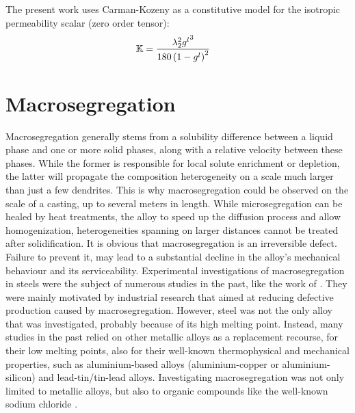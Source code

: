 The present work uses Carman-Kozeny as a constitutive model for the isotropic permeability scalar (zero order tensor):
\begin{align}
\label{eq:permeability}
& \mathbb{K}  = \frac{{\lambda}_{2}^2 {g^l}^3}{180\left( 1-{g^l} \right)^2}
\end{align}
%
%
\section{Macrosegregation}
%
Macrosegregation generally stems from a solubility difference between a liquid phase and one or more solid phases, along with
a relative velocity between these phases. While the former is responsible for local solute enrichment or depletion, the latter
will propagate the composition heterogeneity on a scale much larger than just a few dendrites.
This is why macrosegregation could be observed on the scale of a casting, up to several meters in length. 
While microsegregation can be healed by heat treatments, the alloy to speed up the diffusion process and allow homogenization, heterogeneities 
spanning on larger distances cannot be treated after solidification. It is obvious that macrosegregation is an irreversible defect. 
Failure to prevent it, may lead to a substantial decline in the alloy's mechanical behaviour and its serviceability.
Experimental investigations of macrosegregation in steels were the subject of numerous studies in the past, 
like the work of \citet{suzuki_mechanism_1973,shah_effect_1989,lesoult_macrosegregation_2005}. They were mainly motivated
by industrial research that aimed at reducing defective production caused by macrosegregation.
However, steel was not the only alloy that was investigated, probably because of its high melting point. 
Instead, many studies in the past relied on other metallic alloys as a replacement recourse, for their low
melting points, also for their well-known thermophysical and mechanical properties, such as aluminium-based alloys 
(aluminium-copper or aluminium-silicon) \citep{lesoult_equi-axed_2001,ferreira_macrosegregation_2004,ferreira_modeling_2009} and lead-tin/tin-lead alloys\citep{hebditch_observations_1974,prescott_convective_1994,hachani_experimental_2012}. Investigating macrosegregation 
was not only limited to metallic alloys, but also to organic compounds like the well-known 
sodium chloride \citep{wanqi_formation_1989}.
%
%

